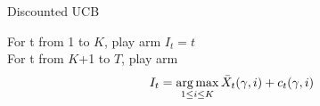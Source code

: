 \begin{algorithm}
    \caption{Discounted UCB}
    For t from 1 to $K$, play arm $I_t = t$ \\
    For t from $K$+1 to $T$, play arm 
    $$ I_t = \operatorname*{arg\,max}_{1\leq i \leq K} \bar X_t(\gamma,i) + c_t(\gamma,i)$$

\end{algorithm}